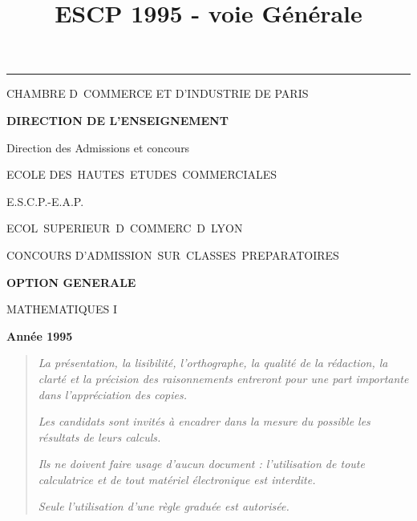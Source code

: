 \documentclass[11pt]{article}%
\title{\bf \vspace{-2cm} ESCP 1995 - voie Générale} %
\author{} %
\date{} %
\begin{document}
\maketitle %
\vspace{-1.4cm}\hrule %
\thispagestyle{fancy}

\vspace*{.2cm}




\begin{center}
{\small CHAMBRE D\E\ COMMERCE ET D'INDUSTRIE DE PARIS}

\textbf{DIRECTION DE L'ENSEIGNEMENT}

Direction des Admissions et concours

\underline{\hspace*{3cm}}

{\Large ECOLE DES\ HAUTES\ ETUDES\ COMMERCIALES}

{\Large E.S.C.P.-E.A.P.}

{\Large ECOL\E\ SUPERIEUR\E\ D\E\ COMMERC\E\ D\E\ LYON}{\large }

CONCOURS D'ADMISSION\ SUR\ CLASSES\ PREPARATOIRES

\underline{\hspace*{3cm}}

\textbf{OPTION GENERALE}

{\Large MATHEMATIQUES I}

\textbf{Année 1995}

\underline{\hspace*{3cm}}
\end{center}

\begin{quotation}
\noindent \textsl{La présentation, la lisibilité, l'orthographe, la
qualité
de la rédaction, la clarté et la précision des raisonnements entreront
pour
une part importante dans l'appréciation des copies.}

\noindent \textsl{Les candidats sont invités à encadrer dans la mesure
du
possible les résultats de leurs calculs.}

\noindent \textsl{Ils ne doivent faire usage d'aucun document :
l'utilisation de toute calculatrice et de tout matériel électronique
est
interdite.}

\noindent \textsl{Seule l'utilisation d'une règle graduée est
autorisée.}

\noindent \textsl{\hrulefill }
\end{quotation}
\end{document}

